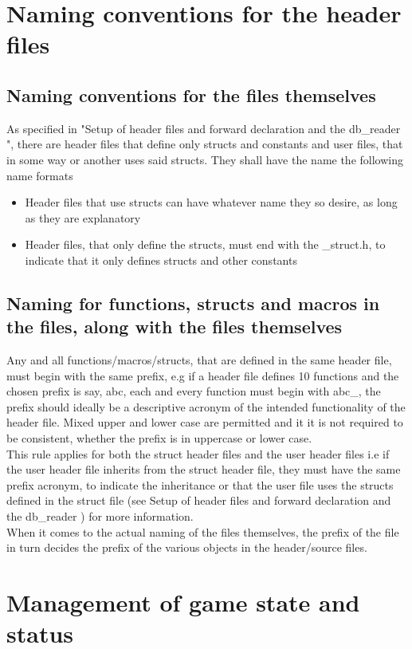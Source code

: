 \documentclass{report}
\begin{document}
\section*{Naming conventions for the header files}
\subsection*{Naming conventions for the files themselves}
As specified in "Setup of header files and forward declaration and the db\_reader ", there are header files that define only structs and constants and user files, that in some way or another uses said structs. They shall have the name the following name formats
\begin{itemize}
\item Header files that use structs can have whatever name they so desire, as long as they are explanatory
\item Header files, that only define the structs, must end with the \_struct.h, to indicate that it only defines structs and other constants
\end{itemize}
\subsection*{Naming for functions, structs and macros in the files, along with the files themselves}
\label{sec:naming}
Any and all functions/macros/structs, that are defined in the same header file, must begin with the same prefix, e.g if a header file defines 10 functions and the chosen prefix is say, abc, each and every function must begin with abc\_, the prefix should ideally be a descriptive acronym of the intended functionality of the header file. Mixed upper and lower case are permitted and it it is not required to be consistent, whether the prefix is in uppercase or lower case.\\

This rule applies for both the struct header files and the user header files i.e if the user header file inherits from the struct header file, they must have the same prefix acronym, to indicate the inheritance or that the user file uses the structs defined in the struct file (see Setup of header files and forward declaration and the db\_reader ) for more information.\\

When it comes to the actual naming of the files themselves, the prefix of the file in turn decides the prefix of the various objects in the header/source files.
\section*{Management of game state and status}
\end{document}
